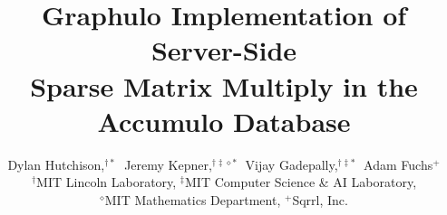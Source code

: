 \documentclass[conference]{IEEEtran}
\begin{document}
\title{Graphulo Implementation of Server-Side \\ Sparse Matrix Multiply in the Accumulo Database}



\author[D. Hutchison et al.]
       {Dylan Hutchison,$^{{\dagger}*}\;$ Jeremy Kepner,$^{{\dagger}{\ddagger}{\diamond}*}\;$ Vijay Gadepally,$^{{\dagger}{\ddagger}*}\;$ Adam Fuchs$^+$ \vspace{6pt}
         \\
         $^{\dagger}$MIT Lincoln Laboratory, 
         $^{\ddagger}$MIT Computer Science \& AI Laboratory, \\
         $^{\diamond}$MIT Mathematics Department, 
         $^+$Sqrrl, Inc. \vspace{-1em}
       }


%
\end{document}
